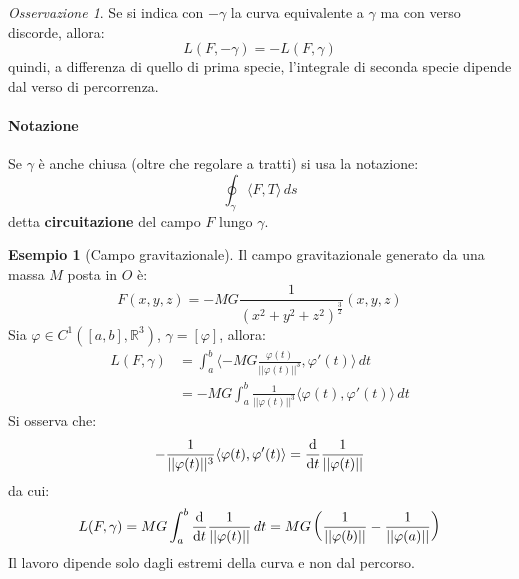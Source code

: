 \documentclass[11pt, a4paper, openright]{book}
\theoremstyle{plain}
\theoremstyle{definition}
\newtheorem{esempio}[teorema]{Esempio}
\theoremstyle{remark}
\newtheorem{osservazione}[teorema]{Osservazione}
\newcommand{\innerprod}[2]{\langle #1, #2 \rangle}
\begin{document}
\begin{osservazione}
    Se si indica con $-\gamma$ la curva equivalente a $\gamma$ ma con verso discorde, allora:
    \begin{equation}
        L(F, -\gamma) = -L(F, \gamma)
    \end{equation}
    quindi, a differenza di quello di prima specie, l'integrale di seconda specie dipende dal verso di percorrenza.
\end{osservazione}

\paragraph{Notazione}
Se $\gamma$ è anche chiusa (oltre che regolare a tratti) si usa la notazione:
\begin{equation}
    \oint_\gamma \innerprod{F}{T} \, ds
\end{equation}
detta \textbf{circuitazione} del campo $F$ lungo $\gamma$.

\begin{esempio}[Campo gravitazionale]
    Il campo gravitazionale generato da una massa $M$ posta in $O$ è:
    \begin{equation}
        F(x, y, z) = -MG \frac{1}{(x^2 + y^2 + z^2)^{\frac{3}{2}}}(x, y, z)
    \end{equation}
    Sia $\varphi \in C^1([a, b], \mathbb{R}^3)$, $\gamma = [\varphi]$, allora:
    \begin{equation}
        \begin{aligned}
            L(F, \gamma) &= \int_{a}^{b} \innerprod{-MG\frac{\varphi(t)}{||\varphi(t)||^3}}{\varphi'(t)} \, dt \\
            &= -MG\int_{a}^{b} \frac{1}{||\varphi(t)||^3}\innerprod{\varphi(t)}{\varphi'(t)} \, dt
        \end{aligned}
    \end{equation}
    Si osserva che:
    \begin{equation}
        -\frac{1}{||\varphi(t)||^3}\innerprod{\varphi(t)}{\varphi'(t)} = \odv{}{t}\frac{1}{||\varphi(t)||}
    \end{equation}
    da cui:
    \begin{equation}
        L(F, \gamma) = MG\int_{a}^{b} \odv{}{t}\frac{1}{||\varphi(t)||} \, dt = MG\left(\frac{1}{||\varphi(b)||} - \frac{1}{||\varphi(a)||}\right)
    \end{equation}
    Il lavoro dipende solo dagli estremi della curva e non dal percorso.
\end{esempio}
\end{document}
